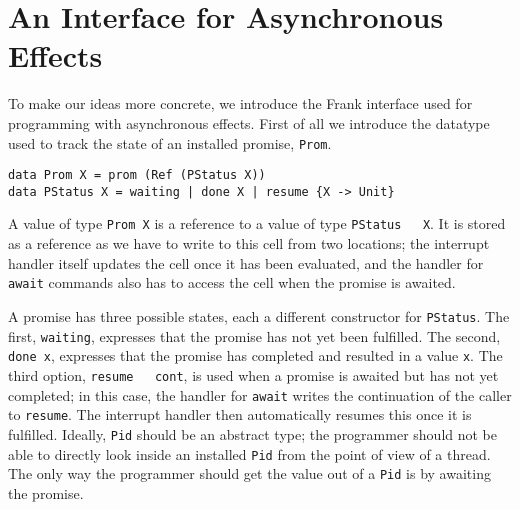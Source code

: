 \documentclass[msc,deptreport,cs]{infthesis} %
\newcommand{\code}[1]{\lstinline{#1}}
\newcommand{\todo}[1]
           {{\par\noindent\small\color{RoyalPurple}
  \framebox{\parbox{\dimexpr\linewidth-2\fboxsep-2\fboxrule}
    {\textbf{TODO:} #1}}}}
\begin{document}






\section{An Interface for Asynchronous Effects}

To make our ideas more concrete, we introduce the Frank interface used for
programming with asynchronous effects. First of all we introduce the datatype
used to track the state of an installed promise, \code{Prom}.

\begin{lstlisting}
data Prom X = prom (Ref (PStatus X))
data PStatus X = waiting | done X | resume {X -> Unit}
\end{lstlisting}

A value of type \code{Prom X} is a reference to a value of type \code{PStatus
  X}. It is stored as a reference as we have to write to this cell from two
locations; the interrupt handler itself updates the cell once it has been
evaluated, and the handler for \code{await} commands also has to access the cell
when the promise is awaited.

A promise has three possible states, each a different constructor for
\code{PStatus}. The first, \code{waiting}, expresses that the promise has not
yet been fulfilled. The second, \code{done x}, expresses that the promise has
completed and resulted in a value \code{x}. The third option, \code{resume
  cont}, is used when a promise is awaited but has not yet completed; in this
case, the handler for \code{await} writes the continuation of the caller to
\code{resume}. The interrupt handler then automatically resumes this once it is
fulfilled. Ideally, \code{Pid} should be an abstract type; the programmer should
not be able to directly look inside an installed \code{Pid} from the point of
view of a thread. The only way the programmer should get the value out of a
\code{Pid} is by awaiting the promise.
\end{document}

